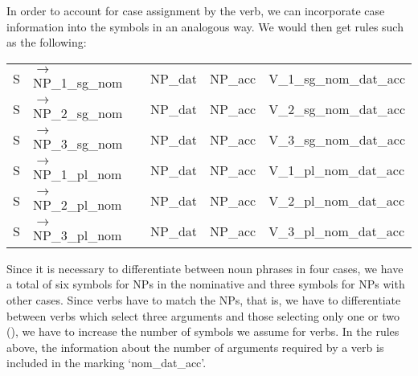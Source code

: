 In order to account for case assignment by the verb, we can incorporate case information into the symbols in an analogous way. We would then
get rules such as the following:
\ea
\label{ditrans-ps-regeln}
\begin{tabular}[t]{@{}l@{ }l@{~~}l@{~~}l@{~~}l}
S  & $\to$ NP\_1\_sg\_nom & NP\_dat & NP\_acc & V\_1\_sg\_nom\_dat\_acc\\
S  & $\to$ NP\_2\_sg\_nom & NP\_dat & NP\_acc & V\_2\_sg\_nom\_dat\_acc\\
S  & $\to$ NP\_3\_sg\_nom & NP\_dat & NP\_acc & V\_3\_sg\_nom\_dat\_acc\\
S  & $\to$ NP\_1\_pl\_nom & NP\_dat & NP\_acc & V\_1\_pl\_nom\_dat\_acc\\
S  & $\to$ NP\_2\_pl\_nom & NP\_dat & NP\_acc & V\_2\_pl\_nom\_dat\_acc\\
S  & $\to$ NP\_3\_pl\_nom & NP\_dat & NP\_acc & V\_3\_pl\_nom\_dat\_acc\\
\end{tabular}
\z
Since it is necessary to differentiate between noun phrases in four cases, we have a total of six symbols for NPs in the nominative and three symbols for NPs with
other cases. Since verbs have to match the NPs, that is, we have to differentiate between verbs which select three arguments and those selecting only one or two (),
we have to increase the number of symbols we assume for verbs.
\eal
{}
\zl
In the rules above, the information about the number of arguments required by a verb is included in the marking `nom\_dat\_acc'.

